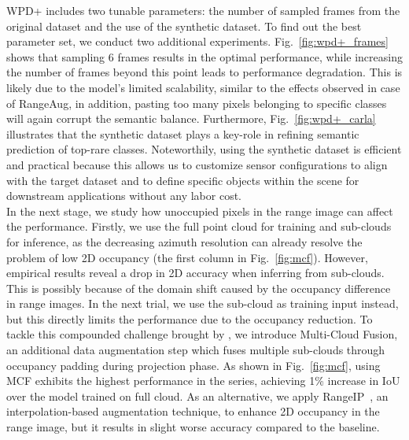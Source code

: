 WPD+ includes two tunable parameters: the number of sampled frames from the original dataset and the use of the synthetic dataset. To find out the best parameter set, we conduct two additional experiments. Fig.~\ref{fig:wpd+_frames} shows that sampling 6 frames results in the optimal performance, while increasing the number of frames beyond this point leads to performance degradation. This is likely due to the model's limited scalability, similar to the effects observed in case of RangeAug\cite{kong2023rethinking}, in addition, pasting too many pixels belonging to specific classes will again corrupt the semantic balance. Furthermore, Fig.~\ref{fig:wpd+_carla} illustrates that the synthetic dataset plays a key-role in refining semantic prediction of top-rare classes. Noteworthily, using the synthetic dataset is efficient and practical because this allows us to customize sensor configurations to align with the target dataset and to define specific objects within the scene for downstream applications without any labor cost.\\
In the next stage, we study how unoccupied pixels in the range image can affect the performance. Firstly, we use the full point cloud for training and sub-clouds for inference, as the decreasing azimuth resolution can already resolve the problem of low 2D occupancy (the first column in Fig.~\ref{fig:mcf}). However, empirical results reveal a drop in 2D accuracy when inferring from sub-clouds. This is possibly because of the domain shift caused by the occupancy difference in range images. In the next trial, we use the sub-cloud as training input instead, but this directly limits the performance due to the occupancy reduction. To tackle this compounded challenge brought by \coolname{}, we introduce Multi-Cloud Fusion, an additional data augmentation step which fuses multiple sub-clouds through occupancy padding during projection phase. As shown in Fig.~\ref{fig:mcf}, using MCF exhibits the highest performance in the series, achieving 1\% increase in IoU over the model trained on full cloud. As an alternative, we apply RangeIP~\cite{xu2023frnet}, an interpolation-based augmentation technique, to enhance 2D occupancy in the range image, but it results in slight worse accuracy compared to the baseline.
